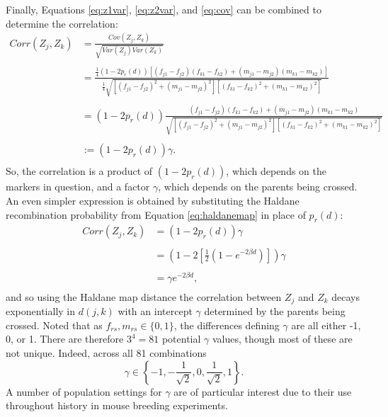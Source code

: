 \documentclass{article}
\begin{document}
Finally, Equations \ref{eq:z1var}, \ref{eq:z2var}, and \ref{eq:cov} can be combined to determine the correlation:
\begin{equation} \label{eq:precorr}
  \begin{split}
    Corr(Z_j, Z_k) & = \frac{Cov(Z_j, Z_k)}{\sqrt{Var(Z_j) Var(Z_k)}}\\
    & \\
    & = \frac{ \frac{1}{4} (1 - 2 p_r(d)) \left [ (f_{j1} - f_{j2})(f_{k1} - f_{k2}) + (m_{j1} - m_{j2})(m_{k1} - m_{k2}) \right ] }{ \frac{1}{4} \sqrt{ \left [ (f_{j1} - f_{j2})^2 + (m_{j1} - m_{j2})^2 \right ] \left [ (f_{k1} - f_{k2})^2 + (m_{k1} - m_{k2})^2 \right ] }} \\
    & \\
    & = (1 - 2 p_r(d)) \frac{ (f_{j1} - f_{j2})(f_{k1} - f_{k2}) + (m_{j1} - m_{j2})(m_{k1} - m_{k2}) }{ \sqrt{ \left [ (f_{j1} - f_{j2})^2 + (m_{j1} - m_{j2})^2 \right ] \left [ (f_{k1} - f_{k2})^2 + (m_{k1} - m_{k2})^2 \right ] }} \\
    & \\
    & := (1 - 2 p_r(d)) \gamma .\\
  \end{split}
\end{equation}
So, the correlation is a product of $(1-2 p_r(d))$, which depends on the markers in question, and a factor $\gamma$, which depends on the parents being crossed. An even simpler expression is obtained by substituting the Haldane recombination probability from Equation \ref{eq:haldanemap} in place of $p_r(d)$:
\begin{equation} \label{eq:corrdist}
  \begin{split}
    Corr(Z_j, Z_k) & = (1 - 2 p_r(d)) \gamma \\
    & \\
    & = \left ( 1 - 2 \left [ \frac{1}{2} \left ( 1 - e^{-2 \beta d} \right ) \right ] \right ) \gamma \\
    & \\
    & = \gamma e^{-2 \beta d}, \\
  \end{split}
\end{equation}
and so using the Haldane map distance the correlation between $Z_j$ and $Z_k$ decays exponentially in $d(j,k)$ with an intercept $\gamma$ determined by the parents being crossed. Noted that as $f_{rs}, m_{rs} \in \{0, 1\}$, the differences defining $\gamma$ are all either -1, 0, or 1. There are therefore $3^4 = 81$ potential $\gamma$ values, though most of these are not unique. Indeed, across all 81 combinations
$$\gamma \in \left \{-1, -\frac{1}{\sqrt{2}}, 0, \frac{1}{\sqrt{2}}, 1 \right \}.$$
A number of population settings for $\gamma$ are of particular interest due to their use throughout history in mouse breeding experiments.
\end{document}
